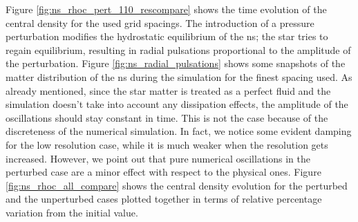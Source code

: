 \documentclass[11pt, a4paper]{article}
\begin{document}
Figure \ref{fig:ns_rhoc_pert_110_rescompare} shows the time evolution of the central density for the used grid spacings. The introduction of a pressure perturbation modifies the hydrostatic equilibrium of the \acrshort{ns}; the star tries to regain equilibrium, resulting in radial pulsations proportional to the amplitude of the perturbation. Figure \ref{fig:ns_radial_pulsations} shows some snapshots of the matter distribution of the \acrshort{ns} during the simulation for the finest spacing used. As already mentioned, since the star matter is treated as a perfect fluid and the simulation doesn't take into account any dissipation effects, the amplitude of the oscillations should stay constant in time. This is not the case because of the discreteness of the numerical simulation. In fact, we notice some evident damping for the low resolution case, while it is much weaker when the resolution gets increased.
However, we point out that pure numerical oscillations in the perturbed case are a minor effect with respect to the physical ones. Figure \ref{fig:ns_rhoc_all_compare} shows the central density evolution for the perturbed and the unperturbed cases plotted together in terms of relative percentage variation from the initial value.

\newpage
\end{document}
